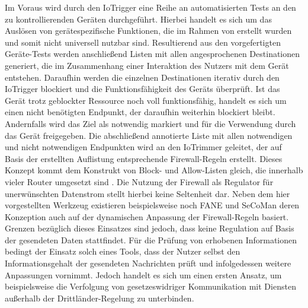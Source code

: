 Im Voraus wird durch den IoTrigger eine Reihe an automatisierten Tests an den zu kontrollierenden Geräten durchgeführt. Hierbei handelt es sich um das Auslösen von gerätespezifische Funktionen, die im Rahmen von \cite[p. 13-14]{Mandalari2021} erstellt wurden und somit nicht universell nutzbar sind. Resultierend aus den vorgefertigten Geräte-Tests werden anschließend Listen mit allen angesprochenen Destinationen generiert, die im Zusammenhang einer Interaktion des Nutzers mit dem Gerät entstehen. Daraufhin werden die einzelnen Destinationen iterativ durch den IoTrigger blockiert und die Funktionsfähigkeit des Geräts überprüft. 
Ist das Gerät trotz geblockter Ressource noch voll funktionsfähig, handelt es sich um einen nicht benötigten Endpunkt, der daraufhin weiterhin blockiert bleibt. Andernfalls wird das Ziel als notwendig markiert und für die Verwendung durch das Gerät freigegeben. Die abschließend annotierte Liste mit allen notwendigen und nicht notwendigen Endpunkten wird an den IoTrimmer geleitet, der auf Basis der erstellten Auflistung entsprechende Firewall-Regeln erstellt. Dieses Konzept kommt dem Konstrukt von Block- und Allow-Listen gleich, die innerhalb vieler Router umgesetzt sind \cite{FritzBox2022}.
Die Nutzung der Firewall als Regulator für unerwünschten Datenstrom stellt hierbei keine Seltenheit dar. Neben dem hier vorgestellten Werkzeug existieren beispielsweise noch FANE \cite{Haar2019} und SeCoMan \cite{Huertas2016} deren Konzeption auch auf der dynamischen Anpassung der Firewall-Regeln basiert. Grenzen bezüglich dieses Einsatzes sind jedoch, dass keine Regulation auf Basis der gesendeten Daten stattfindet. Für die Prüfung von erhobenen Informationen bedingt der Einsatz solch eines Tools, dass der Nutzer selbst den Informationsgehalt der gesendeten Nachrichten prüft und infolgedessen weitere Anpassungen vornimmt. Jedoch handelt es sich um einen ersten Ansatz, um beispielsweise die Verfolgung von gesetzeswidriger Kommunikation mit Diensten außerhalb der Drittländer-Regelung \cite{dsgvo2016} zu unterbinden.


